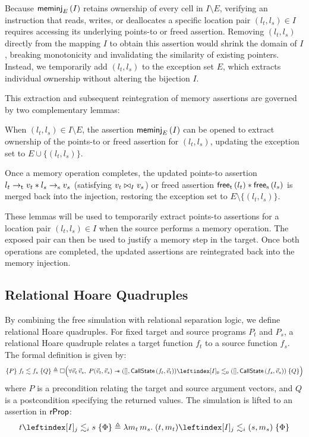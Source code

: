 \documentclass[report.tex]{subfiles}
\begin{document}
Because $\meminj{I}{E}$ retains ownership of every cell in $I \setminus E$,
verifying an instruction that reads,
writes,
or deallocates a specific location pair $(l_t, l_s) \in I$
requires accessing its underlying points-to or freed assertion.
Removing $(l_t, l_s)$ directly from the mapping $I$ to obtain this assertion
would shrink the domain of $I$,
breaking monotonicity and invalidating the similarity of existing pointers.
Instead,
we temporarily add $(l_t, l_s)$ to the exception set $E$,
which extracts individual ownership without altering the bijection $I$.

This extraction and subsequent reintegration of memory assertions
are governed by two complementary lemmas:
\begin{lemma}
  \label{lem:inj-extraction}
  When $(l_t, l_s) \in I \setminus E$,
  the assertion $\meminj{I}{E}$ can be opened to extract ownership
  of the points-to or freed assertion for $(l_t, l_s)$,
  updating the exception set to $E \cup \{ (l_t, l_s) \}$.
\end{lemma}
\begin{lemma}
  \label{lem:inj-reintegration}
  Once a memory operation completes,
  the updated points-to assertion $\ptrt{l_t}{v_t} \sep \ptrs{l_s}{v_s}$
  (satisfying $\sameval{I}{v_t}{v_s}$)
  or freed assertion $\freet{l_t} \sep \frees{l_s}$
  is merged back into the injection,
  restoring the exception set to $E \setminus \{ (l_t, l_s) \}$.
\end{lemma}
These lemmas will be used to temporarily extract
points-to assertions for a location pair $(l_t, l_s) \in I$
when the source performs a memory operation.
The exposed pair can then be used to justify a memory step in the target.
Once both operations are completed,
the updated assertions are reintegrated back into the memory injection.

\subsection{Relational Hoare Quadruples}
\label{sec:rel-hoare}

By combining the free simulation with relational separation logic,
we define relational Hoare quadruples.
For fixed target and source programs $P_t$ and $P_s$,
a relational Hoare quadruple relates a target function $f_t$
to a source function $f_s$.
The formal definition is given by:
\begin{equation*}
  \begin{aligned}
    \hoareq{P}{f_t}{f_s}{Q} \triangleq
    \boxm \Big(
    \forall \vec{v}_t\, \vec{v}_s,\;
    P(\vec{v}_t, \vec{v}_s) \wand
    \fsim{([], \CallState{f_t}{\vec{v}_t})}{0}{0}{([], \CallState{f_s}{\vec{v}_s})}{Q}
    \Big)
  \end{aligned}
\end{equation*}
where $P$ is a precondition relating the target and source argument vectors,
and $Q$ is a postcondition specifying the returned values.
The simulation is lifted to an assertion in $\rProp$:
\begin{equation*}
  \fsim{t}{j}{i}{s}{\Phi}
  \triangleq
  \lambda m_t\, m_s.\;
  \fsim{(t, m_t)}{j}{i}{(s, m_s)}{\Phi}
\end{equation*}
\end{document}
